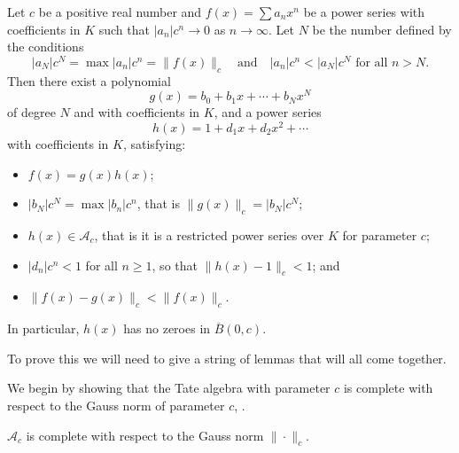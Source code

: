 \begin{thm}\label{WP}
    Let $c$ be a positive real number and $f (x) = \sum a_n x^n$ be a power series with coefficients
    in $K$ such that $ \lvert a_n \rvert c^n \to 0$ as $n \to \infty$. Let $N$ be the number defined
    by the conditions
    \[
    \lvert a_N \rvert c^N = \max \lvert a_n \rvert c^n = \|f(x)\|_c \quad \text{and} \quad
    \lvert a_n \rvert c^n < \lvert a_N \rvert c^N \text{ for all } n > N.
    \]
    Then there exist a polynomial
    \[
    g(x) = b_0 + b_1x + \cdots + b_N x^N
    \]
    of degree $N$ and with coefficients in $K$, and a power series
    \[
    h(x) = 1 + d_1 x + d_2 x^2 + \cdots
    \]
    with coefficients in $K$, satisfying:
    \begin{itemize}
        \item $f(x) = g(x) h(x)$;
        \item $\lvert b_N \rvert c^N = \max \lvert b_n \rvert c^n$, that is
        $\| g (x) \|_c = \lvert b_N \rvert c^N$;
        \item $h(x) \in \mathcal{A}_c$, that is it is a restricted power series over $K$ for
        parameter $c$;
        \item $\lvert d_n \rvert c^n < 1$ for all $n \geq 1$, so that $\| h(x) - 1 \|_c < 1$; and
        \item $\| f(x) - g(x) \|_c < \| f(x)\|_c.$
    \end{itemize}
    In particular, $h(x)$ has no zeroes in $\overline{B}(0,c)$.
\end{thm}

To prove this we will need to give a string of lemmas that will all come together.

We begin by showing that the Tate algebra with parameter $c$ is complete with respect to the Gauss
norm of parameter $c$, \cite[Lemma~7.2.7]{Gouvea}.

\begin{lemma}
    $\mathcal{A}_c$ is complete with respect to the Gauss norm $\|\cdot \|_c$.
\end{lemma}


